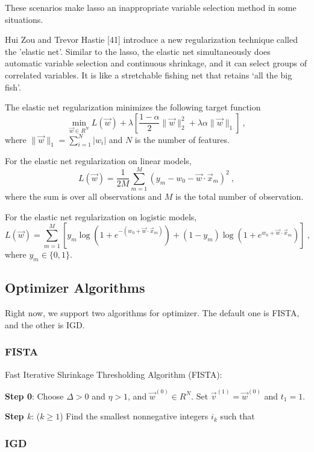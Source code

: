 These scenarios make lasso an inappropriate variable selection method in some situations. 

Hui Zou and Trevor Hastie [41] introduce a new regularization 
technique called the 'elastic net'. Similar to the lasso, the elastic net 
simultaneously does automatic variable selection and continuous
shrinkage, and it can select groups of correlated variables. It is like a 
stretchable fishing net that retains `all the big fish'.

The elastic net regularization minimizes the following target function
\begin{equation}
\min_{\vec{w} \in R^N}L(\vec{w}) + \lambda \left[\frac{1-\alpha}{2}\|\vec{w}\|_2^2 +
  \lambda\alpha \|\vec{w}\|_1\right]\ ,
\end{equation}  
where $\|\vec{w}\|_1 = \sum_{i=1}^N|w_i|$ and $N$ is the number of features.

For the elastic net regularization on linear models, 
\begin{equation}
L(\vec{w}) = \frac{1}{2M}\sum_{m=1}^M\left(y_m - w_0 - \vec{w} \cdot
  \vec{x}_m\right)^2\ ,
\end{equation}
where the sum is over all observations and $M$ is the total number of
observation.

For the elastic net regularization on logistic models,
\begin{equation}
L(\vec{w}) = \sum_{m=1}^M\left[y_m \log\left(1 + e^{-(w_0 +
      \vec{w}\cdot\vec{x}_m)}\right) + (1-y_m) \log\left(1 + e^{w_0 +
      \vec{w}\cdot\vec{x}_m}\right)\right]\ ,
\end{equation}
where $y_m \in \{0,1\}$.

\subsection{Optimizer Algorithms}
Right now, we support two algorithms for optimizer. The default one is
FISTA, and the other is IGD.

\subsubsection{FISTA}

Fast Iterative Shrinkage Thresholding Algorithm (FISTA):

{\bf Step 0}: Choose $\Delta>0$ and $\eta > 1$, and
$\vec{w}^{(0)} \in R^N$. Set $\vec{v}^{(1)}=\vec{w}^{(0)}$ and
$t_1=1$.

{\bf Step $k$}: ($k \ge 1$) Find the smallest nonnegative integers
$i_k$ such that 


\subsubsection{IGD}

